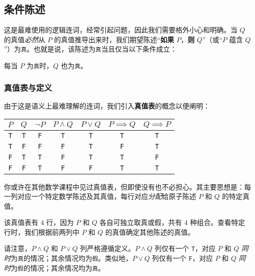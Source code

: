 \subsection{条件陈述}\label{sec:section4.5.3}

这是最难使用的逻辑连词，经常引起问题，因此我们需要格外小心和明确。当 $Q$ 的真值\emph{必然}从 $P$ 的真值推导出来时，我们期望陈述``\textbf{如果} $P$，\textbf{则} $Q$''（或``$P$ 蕴含 $Q$''）为\verb|真|。也就是说，该陈述为\verb|真|当且仅当以下条件成立：

\begin{center}
    每当 $P$ 为\verb|真|时，$Q$ 也为\verb|真|。
\end{center}

\subsubsection*{真值表与定义}

由于这是语义上最难理解的连词，我们引入\textbf{真值表}的概念以便阐明：
\begin{center}
    \begin{tabular}{c|c|c|c|c|c|c}
          $P$      & $Q$      & $\neg P$ & $P \land Q$ &  $P \lor Q$ & $P \implies Q$ & $Q \implies P$\\
          \hline
          \verb|T| & \verb|T| & \verb|F| &   \verb|T|  &  \verb|T|   &    \verb|T|    & \verb|T|\\
          \verb|T| & \verb|F| & \verb|F| &   \verb|F|  &  \verb|T|   &    \verb|F|    & \verb|T|\\
          \verb|F| & \verb|T| & \verb|T| &   \verb|F|  &  \verb|T|   &    \verb|T|    & \verb|F|\\
          \verb|F| & \verb|F| & \verb|T| &   \verb|F|  &  \verb|F|   &    \verb|T|    & \verb|T|\\
    \end{tabular}
\end{center}
你或许在其他数学课程中见过真值表，但即使没有也不必担心。其主要思想是：每一列对应一个特定数学陈述及其真值，每行对应\emph{分配}给原子陈述 $P$ 和 $Q$ 的特定真值。

该真值表有 $4$ 行，因为 $P$ 和 $Q$ 各自可独立取真或假，共有 $4$ 种组合。查看特定行时，我们根据前两列中 $P$ 和 $Q$ 的真值确定其他陈述的真值。

请注意，$P \land Q$ 和 $P \lor Q$ 列严格遵循定义。$P \land Q$ 列仅有一个 \verb|T|，对应 $P$ 和 $Q$ \emph{同时}为\verb|真|的情况；其余情况均为\verb|假|。类似地，$P \lor Q$ 列仅有一个 \verb|F|，对应 $P$ 和 $Q$ \emph{同时}为\verb|假|的情况；其余情况均为\verb|真|。

